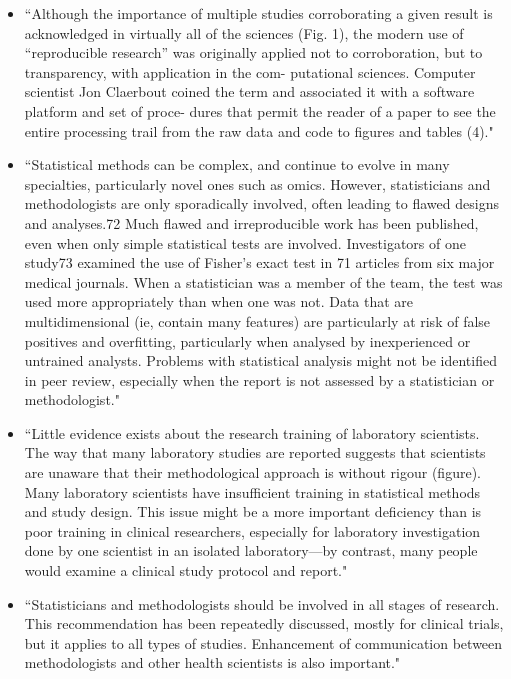 \documentclass[pdftex,english,11pt,parskip=half]{scrartcl}
\begin{document}
\begin{itemize}
\item ``Although the importance of multiple studies corroborating a given result is acknowledged in virtually all of the sciences (Fig. 1), the modern use of “reproducible research” was originally applied not to corroboration, but to transparency, with application in the com- putational sciences. Computer scientist Jon Claerbout coined the term and associated it with a software platform and set of proce- dures that permit the reader of a paper to see the entire processing trail from the raw data and code to figures and tables (4)." \cite{goodman2016does}
\item ``Statistical methods can be complex, and continue to evolve in many specialties, particularly novel ones such as omics. However, statisticians and methodologists are only sporadically involved, often leading to flawed designs and analyses.72 Much flawed and irreproducible work has been published, even when only simple statistical tests are involved. Investigators of one study73 examined the use of Fisher’s exact test in 71 articles from six major medical journals. When a statistician was a member of the team, the test was used more appropriately than when one was not. Data that are multidimensional (ie, contain many features) are particularly at risk of false positives and overfitting, particularly when analysed by inexperienced or untrained analysts. Problems with statistical analysis might not be identified in peer review, especially when the report is not assessed by a statistician or methodologist." \cite{ioannidis2014increasing}
\item ``Little evidence exists about the research training of laboratory scientists. The way that many laboratory studies are reported suggests that scientists are unaware that their methodological approach is without rigour (figure). Many laboratory scientists have insufficient training in statistical methods and study design. This issue might be a more important deficiency than is poor training in clinical researchers, especially for laboratory investigation done by one scientist in an isolated laboratory—by contrast, many people would examine a clinical study protocol and report." \cite{ioannidis2014increasing}
\item ``Statisticians and methodologists should be involved in all stages of research. This recommendation has been repeatedly discussed, mostly for clinical trials, but it applies to all types of studies. Enhancement of communication between methodologists and other health scientists is also important." \cite{ioannidis2014increasing}

\end{itemize}
\end{document}
